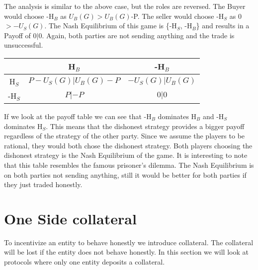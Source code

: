 \documentclass{cacthesis}
\begin{document}
\newline
The analysis is similar to the above case, but the roles are reversed. The Buyer would choose -H$_B$ as $U_B(G) > U_B(G)$-P.\newline
The seller would choose -H$_S$ as 0 $> -U_S(G)$.\newline
The Nash Equilibrium of this game is \{-H$_S$, -H$_B$\} and results in a Payoff of $0|0$. Again, both parties are not sending anything and the trade is unsuccessful.


\begin{center}
\begin{tabular}{ c||c|c| }
& H$_B$ & -H$_B$  \\
\hline
\hline
H$_S$ & $P - U_S(G)|U_B(G) - P$ & $-U_S(G) | U_B(G)$ \\
\hline
-H$_S$ & $P |-P$ & $0 | 0$ \\ 
\hline
\end{tabular}
\end{center}

If we look at the payoff table we can see that -H$_B$ dominates H$_B$ and -H$_S$ dominates H$_S$. This means that the dishonest strategy provides a bigger payoff regardless of the strategy of the other party. \newline
Since we assume the players to be rational, they would both chose the dishonest strategy. Both players choosing the dishonest strategy is the Nash Equilibrium of the game.\newline
It is interesting to note that this table resembles the famous prisoner's dilemma.
The Nash Equilibrium is on both parties not sending anything, still it would be better for both parties if they just traded honestly. 

\section{One Side collateral}
To incentivize an entity to behave honestly we introduce collateral. The collateral will be lost if the entity does not behave honestly. In this section we will look at protocols where only one entity deposits a collateral.
\end{document}
